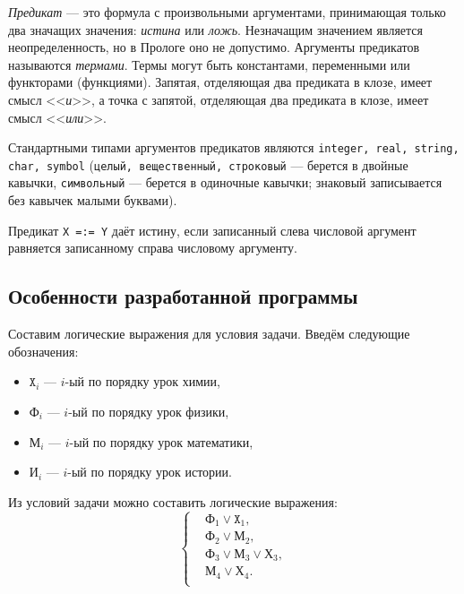 \textit{Предикат} --- это формула с произвольными аргументами, принимающая
только два  значащих значения: \textit{истина} или \textit{ложь}.
Незначащим значением является неопределенность, но в Прологе оно не допустимо.
Аргументы предикатов называются \textit{термами}. Термы могут быть константами,
переменными или функторами (функциями).
Запятая, отделяющая два предиката в клозе, имеет смысл <<\textit{и}>>,
а точка с запятой, отделяющая два предиката в клозе, имеет смысл <<\textit{или}>>.

Стандартными типами аргументов предикатов являются
\texttt{integer, real, string, char, symbol} (\texttt{целый, вещественный,
строковый} --- берется в двойные кавычки,
\texttt{символьный} --- берется в одиночные кавычки;
знаковый записывается без кавычек малыми буквами).

Предикат \texttt{X =:= Y} даёт истину, если записанный слева числовой аргумент равняется
записанному справа числовому аргументу.

\subsection{Особенности разработанной программы}

Составим логические выражения для условия задачи. Введём следующие обозначения:

\begin{itemize}
  \item $\texttt{X}_{i}$ --- $i$-ый по порядку урок химии,
  \item $\texttt{Ф}_{i}$ --- $i$-ый по порядку урок физики,
  \item $\texttt{М}_{i}$ --- $i$-ый по порядку урок математики,
  \item $\texttt{И}_{i}$ --- $i$-ый по порядку урок истории.
\end{itemize}

Из условий задачи можно составить логические выражения:
\begin{equation*}
  \left\{
    \begin{aligned}
      &\texttt{Ф}_1 \lor \texttt{X}_1, \\
      &\texttt{Ф}_2 \lor \texttt{М}_2, \\
      &\texttt{Ф}_3 \lor \texttt{М}_3 \lor \texttt{Х}_3, \\
      &\texttt{М}_4 \lor \texttt{Х}_4. \\
    \end{aligned}
  \right.
\end{equation*}

